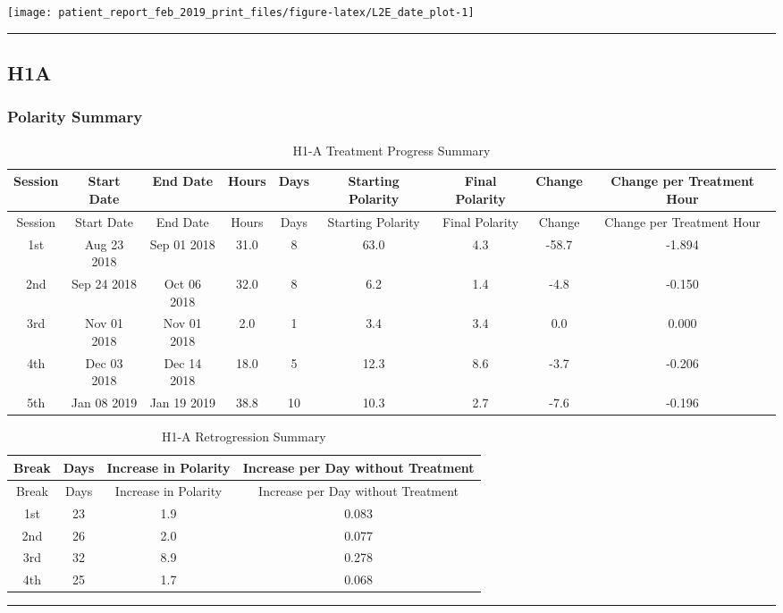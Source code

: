 \documentclass[]{article}
\begin{document}
\texttt{[image: patient\_report\_feb\_2019\_print\_files/figure-latex/L2E\_date\_plot-1]}

\begin{center}\rule{0.5\linewidth}{\linethickness}\end{center}

\subsection{H1A}\label{h1a}

\subsubsection{Polarity Summary}\label{polarity-summary-3}

\begin{longtable}[]{@{}ccccccccc@{}}
\caption{H1-A Treatment Progress Summary}\tabularnewline
\toprule
Session & Start Date & End Date & Hours & Days & Starting Polarity &
Final Polarity & Change & Change per Treatment Hour\tabularnewline
\midrule
\endfirsthead
\toprule
Session & Start Date & End Date & Hours & Days & Starting Polarity &
Final Polarity & Change & Change per Treatment Hour\tabularnewline
\midrule
\endhead
1st & Aug 23 2018 & Sep 01 2018 & 31.0 & 8 & 63.0 & 4.3 & -58.7 &
-1.894\tabularnewline
2nd & Sep 24 2018 & Oct 06 2018 & 32.0 & 8 & 6.2 & 1.4 & -4.8 &
-0.150\tabularnewline
3rd & Nov 01 2018 & Nov 01 2018 & 2.0 & 1 & 3.4 & 3.4 & 0.0 &
0.000\tabularnewline
4th & Dec 03 2018 & Dec 14 2018 & 18.0 & 5 & 12.3 & 8.6 & -3.7 &
-0.206\tabularnewline
5th & Jan 08 2019 & Jan 19 2019 & 38.8 & 10 & 10.3 & 2.7 & -7.6 &
-0.196\tabularnewline
\bottomrule
\end{longtable}

\begin{longtable}[]{@{}cccc@{}}
\caption{H1-A Retrogression Summary}\tabularnewline
\toprule
Break & Days & Increase in Polarity & Increase per Day without
Treatment\tabularnewline
\midrule
\endfirsthead
\toprule
Break & Days & Increase in Polarity & Increase per Day without
Treatment\tabularnewline
\midrule
\endhead
1st & 23 & 1.9 & 0.083\tabularnewline
2nd & 26 & 2.0 & 0.077\tabularnewline
3rd & 32 & 8.9 & 0.278\tabularnewline
4th & 25 & 1.7 & 0.068\tabularnewline
\bottomrule
\end{longtable}

\begin{center}\rule{0.5\linewidth}{\linethickness}\end{center}
\end{document}
